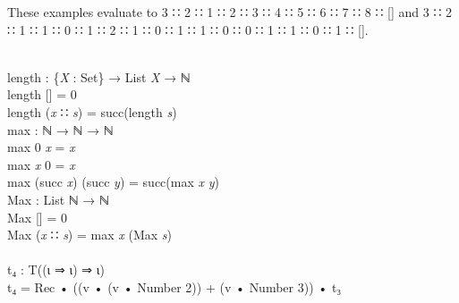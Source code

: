 \documentclass{entcs} \usepackage{prentcsmacro}
\newcommand{\AgdaFontStyle}[1]{\textsf{#1}}
\newcommand{\AgdaBoundFontStyle}[1]{\textit{#1}}
\newcommand{\AgdaNumber}      [1]{\textcolor{AgdaNumber}{#1}}
\newcommand{\AgdaSymbol}      [1]{\textcolor{AgdaSymbol}{#1}}
\newcommand{\AgdaPrimitiveType}[1]
    {\AgdaFontStyle{\textcolor{AgdaPrimitiveType}{#1}}}
\newcommand{\AgdaBound}    [1]{\AgdaBoundFontStyle{\textcolor{AgdaBound}{#1}}}
\newcommand{\AgdaInductiveConstructor}[1]
    {\AgdaFontStyle{\textcolor{AgdaInductiveConstructor}{#1}}}
\newcommand{\AgdaDatatype} [1]{\AgdaFontStyle{\textcolor{AgdaDatatype}{#1}}}
\newcommand{\AgdaFunction} [1]{\AgdaFontStyle{\textcolor{AgdaFunction}{#1}}}
\newcommand{\AgdaCodeStyle}{\small}
\newenvironment{code}%
{\noindent\AgdaCodeStyle\pboxed}%
{\endpboxed\par\noindent%
\ignorespacesafterend}
\begin{document}
These examples evaluate to 3 ∷ 2 ∷ 1 ∷ 2 ∷ 3 ∷ 4 ∷ 5 ∷ 6 ∷ 7 ∷ 8 ∷ []
and 3 ∷ 2 ∷ 1 ∷ 1 ∷ 0 ∷ 1 ∷ 2 ∷ 1 ∷ 0 ∷ 1 ∷ 1 ∷ 0 ∷ 0 ∷ 1 ∷ 1 ∷ 0 ∷ 1 ∷ [].

\begin{code}\>\<%
\\
\>\AgdaFunction{length} \AgdaSymbol{:} \AgdaSymbol{\{}\AgdaBound{X} \AgdaSymbol{:} \AgdaPrimitiveType{Set}\AgdaSymbol{\}} \AgdaSymbol{→} \AgdaDatatype{List} \AgdaBound{X} \AgdaSymbol{→} \AgdaDatatype{ℕ}\<%
\\
\>\AgdaFunction{length} \AgdaInductiveConstructor{[]} \AgdaSymbol{=} \AgdaNumber{0}\<%
\\
\>\AgdaFunction{length} \AgdaSymbol{(}\AgdaBound{x} \AgdaInductiveConstructor{∷} \AgdaBound{s}\AgdaSymbol{)} \AgdaSymbol{=} \AgdaInductiveConstructor{succ}\AgdaSymbol{(}\AgdaFunction{length} \AgdaBound{s}\AgdaSymbol{)}\<%
\\
\>\AgdaFunction{max} \AgdaSymbol{:} \AgdaDatatype{ℕ} \AgdaSymbol{→} \AgdaDatatype{ℕ} \AgdaSymbol{→} \AgdaDatatype{ℕ}\<%
\\
\>\AgdaFunction{max} \AgdaInductiveConstructor{0} \AgdaBound{x} \AgdaSymbol{=} \AgdaBound{x}\<%
\\
\>\AgdaFunction{max} \AgdaBound{x} \AgdaInductiveConstructor{0} \AgdaSymbol{=} \AgdaBound{x}\<%
\\
\>\AgdaFunction{max} \AgdaSymbol{(}\AgdaInductiveConstructor{succ} \AgdaBound{x}\AgdaSymbol{)} \AgdaSymbol{(}\AgdaInductiveConstructor{succ} \AgdaBound{y}\AgdaSymbol{)} \AgdaSymbol{=} \AgdaInductiveConstructor{succ}\AgdaSymbol{(}\AgdaFunction{max} \AgdaBound{x} \AgdaBound{y}\AgdaSymbol{)}\<%
\\
\>\AgdaFunction{Max} \AgdaSymbol{:} \AgdaDatatype{List} \AgdaDatatype{ℕ} \AgdaSymbol{→} \AgdaDatatype{ℕ}\<%
\\
\>\AgdaFunction{Max} \AgdaInductiveConstructor{[]} \AgdaSymbol{=} \AgdaNumber{0}\<%
\\
\>\AgdaFunction{Max} \AgdaSymbol{(}\AgdaBound{x} \AgdaInductiveConstructor{∷} \AgdaBound{s}\AgdaSymbol{)} \AgdaSymbol{=} \AgdaFunction{max} \AgdaBound{x} \AgdaSymbol{(}\AgdaFunction{Max} \AgdaBound{s}\AgdaSymbol{)}\<%
\\
%
\\
\>\AgdaFunction{t₄} \AgdaSymbol{:} \AgdaDatatype{T}\AgdaSymbol{((}\AgdaInductiveConstructor{ι} \AgdaInductiveConstructor{⇒} \AgdaInductiveConstructor{ι}\AgdaSymbol{)} \AgdaInductiveConstructor{⇒} \AgdaInductiveConstructor{ι}\AgdaSymbol{)}\<%
\\
\>\AgdaFunction{t₄} \AgdaSymbol{=} \AgdaInductiveConstructor{Rec} \AgdaFunction{•} \AgdaSymbol{((}\AgdaFunction{v} \AgdaFunction{•} \AgdaSymbol{(}\AgdaFunction{v} \AgdaFunction{•} \AgdaFunction{Number} \AgdaNumber{2}\AgdaSymbol{))} \AgdaFunction{+} \AgdaSymbol{(}\AgdaFunction{v} \AgdaFunction{•} \AgdaFunction{Number} \AgdaNumber{3}\AgdaSymbol{))} \AgdaFunction{•} \AgdaFunction{t₃}\<%

\end{code}
\end{document}
